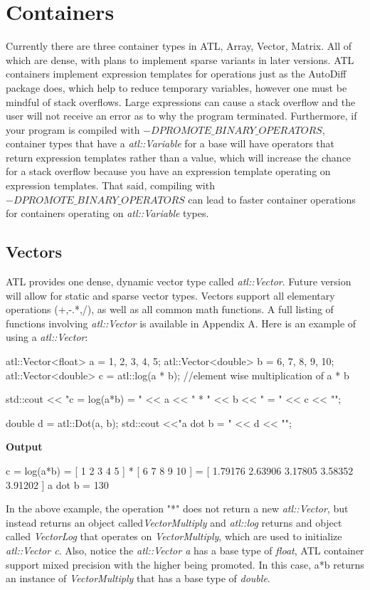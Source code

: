 \documentclass[12pt,a4paper]{article}
\begin{document}
\section{Containers}
Currently there are three container types in ATL, Array, Vector, Matrix. All of which are dense, with plans to implement sparse variants in later versions. ATL containers implement expression templates for operations just as the AutoDiff package does, which help to reduce temporary variables, however one must be mindful of stack overflows. Large expressions can cause a stack overflow and the user will not receive an error as to why the program terminated. Furthermore, if your program is compiled with \textit{$-DPROMOTE\_BINARY\_OPERATORS$}, container types that have a \textit{atl::Variable} for a base will have operators that return expression templates rather than a value, which will increase the chance for a stack overflow because you have an expression template operating on expression templates. That said, compiling with \textit{$-DPROMOTE\_BINARY\_OPERATORS$} can lead to faster container operations for containers operating on \textit{atl::Variable} types.
\subsection{Vectors}
ATL provides one dense, dynamic vector type called \textit{atl::Vector}. Future version will allow for static and sparse vector types. Vectors support all elementary operations (+,-.*,/), as well as all common math functions. A full listing of functions involving \textit{atl::Vector} is available in Appendix A. Here is an example of using a \textit{atl::Vector}:
\begin{cppsource}

    atl::Vector<float> a = {1, 2, 3, 4, 5};
    atl::Vector<double> b = {6, 7, 8, 9, 10};
    atl::Vector<double> c = atl::log(a * b); //element wise multiplication of a * b
    
    std::cout << "c = log(a*b) = " << a << " * " << b << " = " << c << "\n";

    double d = atl::Dot(a, b);
    std::cout <<"a dot b = " << d << "\n";
  
\end{cppsource}
\textbf{Output}
\begin{myoutput}
c = log(a*b) = [ 1 2 3 4 5 ] * [ 6 7 8 9 10 ] = [ 1.79176 2.63906 3.17805 3.58352 3.91202 ]
a dot b = 130
\end{myoutput}
In the above example, the operation "*" does not return a new \textit{atl::Vector}, but instead returns an object called\textit{VectorMultiply} and \textit{atl::log} returns and object called \textit{VectorLog} that operates on \textit{VectorMultiply}, which are used to initialize \textit{atl::Vector c}. Also, notice the \textit{atl::Vector a} has a base type of \textit{float}, ATL container support mixed precision with the higher being promoted. In this case, a*b returns an instance of \textit{VectorMultiply}  that has a base type of \textit{double}.
\end{document}
